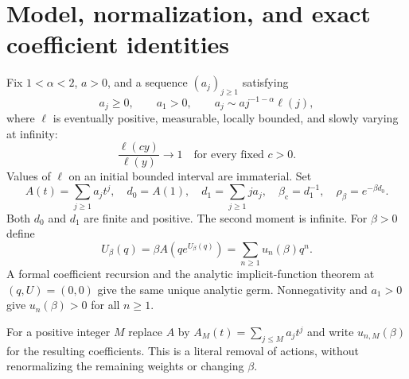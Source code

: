 \documentclass[11pt,a4paper]{article}
\numberwithin{equation}{section}
\theoremstyle{definition}\newtheorem{definition}[theorem]{Definition}
\theoremstyle{remark}\newtheorem{remark}[theorem]{Remark}
\theoremstyle{definition}
\newcommand{\bc}{\beta_{\mathrm c}}\newcommand{\rhoc}{\rho_{\mathrm c}}
\begin{document}
\section{Model, normalization, and exact coefficient identities}
\label{sec:model}

Fix $1<\alpha<2$, $a>0$, and a sequence $(a_j)_{j\ge1}$ satisfying
\begin{equation}\label{eq:assumptions}
 a_j\ge0,\qquad a_1>0,\qquad
 a_j\sim a j^{-1-\alpha}\ell(j),
\end{equation}
where $\ell$ is eventually positive, measurable, locally bounded, and slowly
varying at infinity:
\[
 \frac{\ell(cy)}{\ell(y)}\longrightarrow1
 \quad\text{for every fixed }c>0.
\]
Values of $\ell$ on an initial bounded interval are immaterial. Set
\begin{equation}\label{eq:constants}
 A(t)=\sum_{j\ge1}a_jt^j,\quad d_0=A(1),\quad
 d_1=\sum_{j\ge1}j a_j,\quad
 \bc=d_1^{-1},\quad \rho_\beta=e^{-\beta d_0}.
\end{equation}
Both $d_0$ and $d_1$ are finite and positive. The second moment is infinite.
For $\beta>0$ define
\begin{equation}\label{eq:feedback}
 U_\beta(q)=\beta A(qe^{U_\beta(q)})
           =\sum_{n\ge1}u_n(\beta)q^n.
\end{equation}
A formal coefficient recursion and the analytic implicit-function theorem
at $(q,U)=(0,0)$ give the same unique analytic germ. Nonnegativity and $a_1>0$
give $u_n(\beta)>0$ for all $n\ge1$.

For a positive integer $M$ replace $A$ by
$A_M(t)=\sum_{j\le M}a_jt^j$ and write $u_{n,M}(\beta)$ for the resulting
coefficients. This is a literal removal of actions, without renormalizing
the remaining weights or changing $\beta$.
\end{document}
